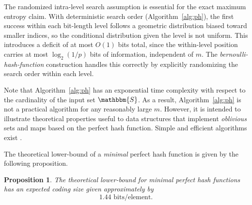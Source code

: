 \documentclass[hidelinks,11pt,final]{article}
\newcommand{\envnumstyle}{section}
\theoremstyle{plain}
\newtheorem{proposition}{Proposition}[\envnumstyle] %
\newenvironment{remark}
  {\pushQED{\qed}\renewcommand{\qedsymbol}{$\triangle$}\remarkx}
  {\popQED\endremarkx}
\begin{document}
\begin{remark}
The randomized intra-level search assumption is essential for the exact maximum entropy claim. With deterministic search order (Algorithm~\ref{alg:ph}), the first success within each bit-length level follows a geometric distribution biased toward smaller indices, so the conditional distribution given the level is not uniform. This introduces a deficit of at most $O(1)$ bits total, since the within-level position carries at most $\log_2(1/p)$ bits of information, independent of $m$. The \emph{bernoulli-hash-function} construction handles this correctly by explicitly randomizing the search order within each level.
\end{remark}

Note that Algorithm~\ref{alg:ph} has an exponential time 
complexity with respect to the cardinality of the input set $\mathbbm{S}$. As a 
result, Algorithm~\ref{alg:ph} is not a practical algorithm for any reasonably large 
$m$. However, it is intended to illustrate theoretical properties useful to 
data structures that implement \emph{oblivious} sets and maps\cite{phf,pmf} 
based on the perfect hash function. Simple and efficient algorithms exist 
\cite{chd,simple}. 

The theoretical lower-bound of a \emph{minimal} perfect hash function is given by the following proposition.
\begin{proposition}
\label{pst:lb}
The theoretical lower-bound for \emph{minimal} perfect hash functions has an expected coding size given approximately by
\begin{equation}
\label{eq:low_bound}
    1.44\text{ bits/element}.
\end{equation}
\end{proposition}
\end{document}
